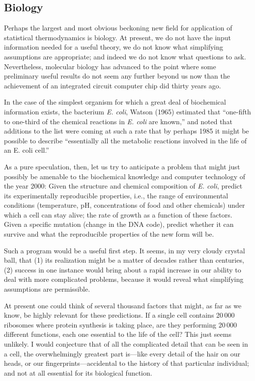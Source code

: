 {\subsection{Biology}
Perhaps the largest and most obvious beckoning new field for application of statistical thermodynamics is biology.
At present, we do not have the input information needed for a useful theory, we do not know what simplifying assumptions are appropriate; and indeed we do not know what questions to ask.
Nevertheless, molecular biology has advanced to the point where some preliminary useful results do not seem any further beyond us now than the achievement of an integrated circuit computer chip did thirty years ago.

In the case of the simplest organism for which a great deal of biochemical information exists, the bacterium \emph{E. coli}, Watson (\cite{watson}{1965}) estimated that ``one-fifth to one-third of the chemical reactions in \emph{E. coli} are known,'' and noted that additions to the list were coming at such a rate that by perhaps 1985 it might be possible to describe ``essentially all the metabolic reactions involved in the life of an E. coli cell.''

As a pure speculation, then, let us try to anticipate a problem that might just possibly be amenable to the biochemical knowledge and computer technology of the year 2000: Given the structure and chemical composition of \emph{E. coli}, predict its experimentally reproducible properties, i.e., the range of environmental conditions (temperature, pH, concentrations of food and other chemicals) under which a cell can stay alive; the rate of growth as a function of these factors.
Given a specific mutation (change in the DNA code), predict whether it can survive and what the reproducible properties of the new form will be.

Such a program would be a useful first step.
It seems, in my very cloudy crystal ball, that (1) its realization might be a matter of decades rather than centuries, (2) success in one instance would bring about a rapid increase in our ability to deal with more complicated problems, because it would reveal what simplifying assumptions are permissible.

At present one could think of several thousand factors that might, as far as we know, be highly relevant for these predictions.
If a single cell contains 20\,000 ribosomes where protein synthesis is taking place, are they performing 20\,000 different functions, each one essential to the life of the cell? This just seems unlikely.
I would conjecture that of all the complicated detail that can be seen in a cell, the overwhelmingly greatest part is---like every detail of the hair on our heads, or our fingerprints---accidental to the history of that particular individual; and not at all essential for its biological function.

}
